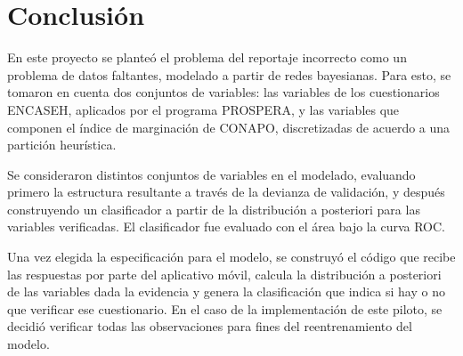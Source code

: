 \chapter{Conclusión}
\label{chap:conclusion}
En este proyecto se planteó el problema del reportaje incorrecto como un problema de datos faltantes, modelado a partir de redes bayesianas. Para esto, se tomaron en cuenta dos conjuntos de variables: las variables de los cuestionarios ENCASEH, aplicados por el programa PROSPERA, y las variables que componen el índice de marginación de CONAPO, discretizadas de acuerdo a una partición heurística.
\par
\noindent
Se consideraron distintos conjuntos de variables en el modelado, evaluando primero la estructura resultante a través de la devianza de validación, y después construyendo un clasificador a partir de la distribución a posteriori para las variables verificadas. El clasificador fue evaluado con el área bajo la curva ROC.
\par
\noindent
Una vez elegida la especificación para el modelo, se construyó el código que recibe las respuestas por parte del aplicativo móvil, calcula la distribución a posteriori de las variables dada la evidencia y genera la clasificación que indica si hay o no que verificar ese cuestionario. En el caso de la implementación de este piloto, se decidió verificar todas las observaciones para fines del reentrenamiento del modelo.
